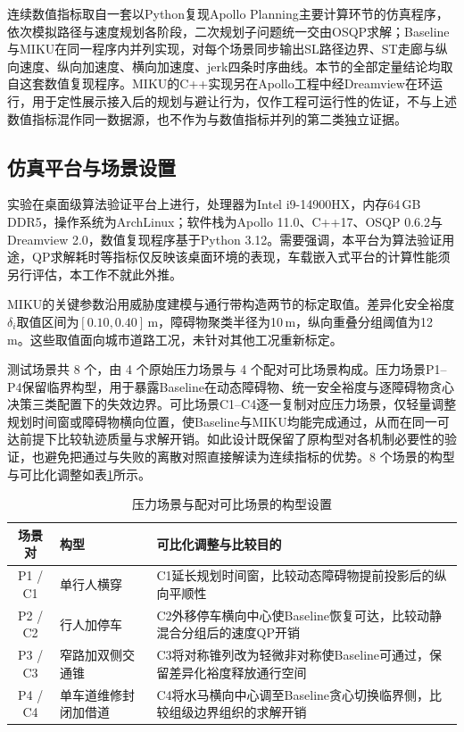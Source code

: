 \documentclass[a4paper,11pt]{ctexart}
\theoremstyle{definition}
\begin{document}
连续数值指标取自一套以Python复现Apollo Planning主要计算环节的仿真程序，依次模拟路径与速度规划各阶段，二次规划子问题统一交由OSQP求解；Baseline与MIKU在同一程序内并列实现，对每个场景同步输出SL路径边界、ST走廊与纵向速度、纵向加速度、横向加速度、jerk四条时序曲线。本节的全部定量结论均取自这套数值复现程序。MIKU的C++实现另在Apollo工程中经Dreamview在环运行，用于定性展示接入后的规划与避让行为，仅作工程可运行性的佐证，不与上述数值指标混作同一数据源，也不作为与数值指标并列的第二类独立证据。

\subsection{仿真平台与场景设置}
\label{subsec:exp_setup}

实验在桌面级算法验证平台上进行，处理器为Intel i9-14900HX，内存64\,GB DDR5，操作系统为ArchLinux；软件栈为Apollo 11.0、C++17、OSQP 0.6.2与Dreamview 2.0，数值复现程序基于Python 3.12。需要强调，本平台为算法验证用途，QP求解耗时等指标仅反映该桌面环境的表现，车载嵌入式平台的计算性能须另行评估，本工作不就此外推。

MIKU的关键参数沿用威胁度建模与通行带构造两节的标定取值。差异化安全裕度$\delta_i$取值区间为$[0.10, 0.40]$\,m，障碍物聚类半径为10\,m，纵向重叠分组阈值为12\,m。这些取值面向城市道路工况，未针对其他工况重新标定。

测试场景共 8 个，由 4 个原始压力场景与 4 个配对可比场景构成。压力场景P1--P4保留临界构型，用于暴露Baseline在动态障碍物、统一安全裕度与逐障碍物贪心决策三类配置下的失效边界。可比场景C1--C4逐一复制对应压力场景，仅轻量调整规划时间窗或障碍物横向位置，使Baseline与MIKU均能完成通过，从而在同一可达前提下比较轨迹质量与求解开销。如此设计既保留了原构型对各机制必要性的验证，也避免把通过与失败的离散对照直接解读为连续指标的优势。8 个场景的构型与可比化调整如表\ref{tab:exp_scenarios}所示。

\begin{table}[htbp]
\centering
\caption{压力场景与配对可比场景的构型设置}
\label{tab:exp_scenarios}
\small
\begin{tabular}{c l p{7.4cm}}
\toprule
\textbf{场景对} & \textbf{构型} & \textbf{可比化调整与比较目的} \\
\midrule
P1 / C1 & 单行人横穿 & C1延长规划时间窗，比较动态障碍物提前投影后的纵向平顺性 \\
P2 / C2 & 行人加停车 & C2外移停车横向中心使Baseline恢复可达，比较动静混合分组后的速度QP开销 \\
P3 / C3 & 窄路加双侧交通锥 & C3将对称锥列改为轻微非对称使Baseline可通过，保留差异化裕度释放通行空间 \\
P4 / C4 & 单车道维修封闭加借道 & C4将水马横向中心调至Baseline贪心切换临界侧，比较组级边界组织的求解开销 \\
\bottomrule
\end{tabular}
\end{table}
\end{document}
